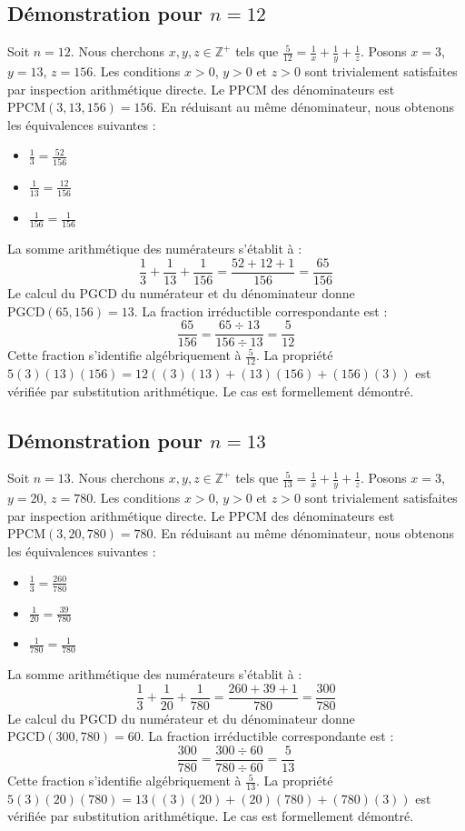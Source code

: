 \documentclass[12pt,a4paper]{article}
\begin{document}
\subsection{Démonstration pour $n = 12$}
Soit $n = 12$. Nous cherchons $x, y, z \in \mathbb{Z}^{+}$ tels que $\frac{5}{12} = \frac{1}{x} + \frac{1}{y} + \frac{1}{z}$.
Posons $x = 3$, $y = 13$, $z = 156$.
Les conditions $x > 0$, $y > 0$ et $z > 0$ sont trivialement satisfaites par inspection arithmétique directe.
Le PPCM des dénominateurs est $\text{PPCM}(3, 13, 156) = 156$.
En réduisant au même dénominateur, nous obtenons les équivalences suivantes :
\begin{itemize}
    \item $\frac{1}{3} = \frac{52}{156}$
    \item $\frac{1}{13} = \frac{12}{156}$
    \item $\frac{1}{156} = \frac{1}{156}$
\end{itemize}
La somme arithmétique des numérateurs s'établit à :
$$ \frac{1}{3} + \frac{1}{13} + \frac{1}{156} = \frac{52 + 12 + 1}{156} = \frac{65}{156} $$
Le calcul du PGCD du numérateur et du dénominateur donne $\text{PGCD}(65, 156) = 13$.
La fraction irréductible correspondante est :
$$ \frac{65}{156} = \frac{65 \div 13}{156 \div 13} = \frac{5}{12} $$
Cette fraction s'identifie algébriquement à $\frac{5}{12}$.
La propriété $5(3)(13)(156) = 12((3)(13) + (13)(156) + (156)(3))$ est vérifiée par substitution arithmétique.
Le cas est formellement démontré.

\subsection{Démonstration pour $n = 13$}
Soit $n = 13$. Nous cherchons $x, y, z \in \mathbb{Z}^{+}$ tels que $\frac{5}{13} = \frac{1}{x} + \frac{1}{y} + \frac{1}{z}$.
Posons $x = 3$, $y = 20$, $z = 780$.
Les conditions $x > 0$, $y > 0$ et $z > 0$ sont trivialement satisfaites par inspection arithmétique directe.
Le PPCM des dénominateurs est $\text{PPCM}(3, 20, 780) = 780$.
En réduisant au même dénominateur, nous obtenons les équivalences suivantes :
\begin{itemize}
    \item $\frac{1}{3} = \frac{260}{780}$
    \item $\frac{1}{20} = \frac{39}{780}$
    \item $\frac{1}{780} = \frac{1}{780}$
\end{itemize}
La somme arithmétique des numérateurs s'établit à :
$$ \frac{1}{3} + \frac{1}{20} + \frac{1}{780} = \frac{260 + 39 + 1}{780} = \frac{300}{780} $$
Le calcul du PGCD du numérateur et du dénominateur donne $\text{PGCD}(300, 780) = 60$.
La fraction irréductible correspondante est :
$$ \frac{300}{780} = \frac{300 \div 60}{780 \div 60} = \frac{5}{13} $$
Cette fraction s'identifie algébriquement à $\frac{5}{13}$.
La propriété $5(3)(20)(780) = 13((3)(20) + (20)(780) + (780)(3))$ est vérifiée par substitution arithmétique.
Le cas est formellement démontré.
\end{document}
